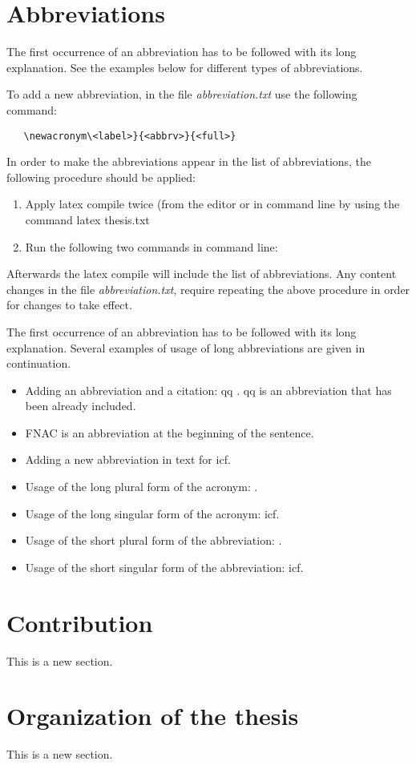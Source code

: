 \section{Abbreviations}
The first occurrence of an abbreviation has to be followed with its long explanation. See the examples below for different types of abbreviations.

To add a new abbreviation, in the file \emph{abbreviation.txt} use the following command:
\begin{verbatim} 
   \newacronym\<label>}{<abbrv>}{<full>}
\end{verbatim}

In order to make the abbreviations appear in the list of abbreviations, the following procedure should be applied:
\begin{enumerate}
	\item {Apply latex compile twice (from the editor or in command line by using the command latex thesis.txt}
	\item{Run the following two commands in command line:}
\end{enumerate}

Afterwards the latex compile will include the list of abbreviations. Any content changes in the file \emph{abbreviation.txt}, require repeating the above procedure in order for changes to take effect.

The first occurrence of an abbreviation has to be followed with its long explanation. Several examples of usage of long abbreviations are given in continuation.

\begin{itemize}
	\item Adding an abbreviation and a citation: \gls{qq} \citep{BohanecBook}. \gls{qq} is an abbreviation that has been already included. 
	\item \Gls{FNAC} is an abbreviation at the beginning of the sentence.
	\item Adding a new abbreviation in text for \gls{icf}.
	\item Usage of the long plural form of the acronym: . 
	\item Usage of the long singular form of the acronym: \acrlong{icf}.
	\item Usage of the short plural form of the abbreviation: . 
	\item Usage of the short singular form of the abbreviation: \acrshort{icf}.
\end{itemize}


\section{Contribution}

This is a new section.


\section{Organization of the thesis}

This is a new section.
